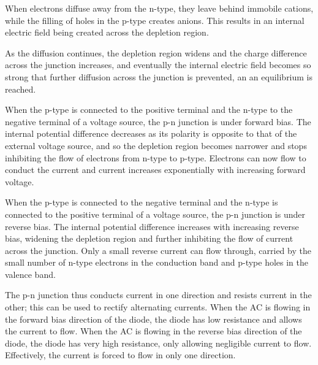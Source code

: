 \documentclass[Physics.tex]{subfiles}
\begin{document}
When electrons diffuse away from the n-type, they leave behind immobile cations, while the filling of holes in the p-type creates anions. This results in an internal electric field being created across the depletion region.

As the diffusion continues, the depletion region widens and the charge difference across the junction increases, and eventually the internal electric field becomes so strong that further diffusion across the junction is prevented, an an equilibrium is reached.

When the p-type is connected to the positive terminal and the n-type to the negative terminal of a voltage source, the p-n junction is under forward bias. The internal potential difference decreases as its polarity is opposite to that of the external voltage source, and so the depletion region becomes narrower and stops inhibiting the flow of electrons from n-type to p-type. Electrons can now flow to conduct the current and current increases exponentially with increasing forward voltage.

When the p-type is connected to the negative terminal and the n-type is connected to the positive terminal of a voltage source, the p-n junction is under reverse bias. The internal potential difference increases with increasing reverse bias, widening the depletion region and further inhibiting the flow of current across the junction. Only a small reverse current can flow through, carried by the small number of n-type electrons in the conduction band and p-type holes in the valence band.

The p-n junction thus conducts current in one direction and resists current in the other; this can be used to rectify alternating currents. When the AC is flowing in the forward bias direction of the diode, the diode has low resistance and allows the current to flow. When the AC is flowing in the reverse bias direction of the diode, the diode has very high resistance, only allowing negligible current to flow. Effectively, the current is forced to flow in only one direction.
\end{document}
